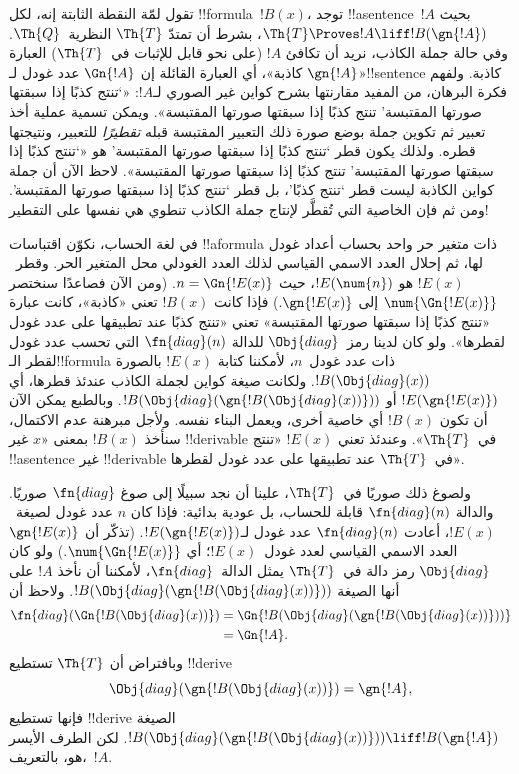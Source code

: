\documentclass[../../../include/open-logic-section]{subfiles}
\begin{document}


\begin{explain}
تقول لمّة النقطة الثابتة إنه، لكل !!{formula}~$!B(x)$، توجد
!!a{sentence}~$!A$ بحيث $\Th{T}\Proves !A\liff !B(\gn{!A})$، بشرط
أن تمتدّ $\Th{T}$ النظرية~$\Th{Q}$. وفي حالة جملة الكاذب، نريد أن
تكافئ $!A$ (على نحو قابل للإثبات في~$\Th{T}$) العبارة «$\gn{!A}$
كاذبة»، أي العبارة القائلة إن $\Gn{!A}$ عدد غودل لـ!!{sentence}
كاذبة. ولفهم فكرة البرهان، من المفيد مقارنتها بشرح كواين غير الصوري
لـ$!A$: «`تنتج كذبًا إذا سبقتها صورتها المقتبسة' تنتج كذبًا إذا
سبقتها صورتها المقتبسة». ويمكن تسمية عملية أخذ تعبير ثم تكوين جملة
بوضع صورة ذلك التعبير المقتبسة قبله \emph{تقطيرًا} للتعبير، ونتيجتها
قطره. ولذلك يكون قطر `تنتج كذبًا إذا سبقتها صورتها المقتبسة' هو
«`تنتج كذبًا إذا سبقتها صورتها المقتبسة' تنتج كذبًا إذا سبقتها صورتها
المقتبسة». لاحظ الآن أن جملة كواين الكاذبة ليست قطر `تنتج كذبًا'، بل
قطر `تنتج كذبًا إذا سبقتها صورتها المقتبسة'. ومن ثم فإن الخاصية التي
تُقطَّر لإنتاج جملة الكاذب تنطوي هي نفسها على التقطير!{}

في لغة الحساب، نكوّن اقتباسات !!a{formula} ذات متغير حر واحد بحساب
أعداد غودل لها، ثم إحلال العدد الاسمي القياسي لذلك العدد الغودلي محل
المتغير الحر. وقطر~$!E(x)$ هو $!E(\num{n})$، حيث
$n=\Gn{!E(x)}$. (ومن الآن فصاعدًا سنختصر $\num{\Gn{!E(x)}}$ إلى
$\gn{!E(x)}$.) فإذا كانت $!B(x)$ تعني «كاذبة»، كانت عبارة «تنتج
كذبًا إذا سبقتها صورتها المقتبسة» تعني «تنتج كذبًا عند تطبيقها على عدد
غودل لقطرها». ولو كان لدينا رمز~$\Obj{diag}$ للدالة $\fn{diag}(n)$
التي تحسب عدد غودل لقطر الـ!!{formula} ذات عدد غودل~$n$، لأمكننا كتابة
$!E(x)$ بالصورة $!B(\Obj{diag}(x))$. ولكانت صيغة كواين لجملة الكاذب
عندئذ قطرها، أي $!E(\gn{!E(x)})$ أو
$!B(\Obj{diag}(\gn{!B(\Obj{diag}(x))}))$. وبالطبع يمكن الآن أن تكون
$!B(x)$ أي خاصية أخرى، ويعمل البناء نفسه. ولأجل مبرهنة عدم الاكتمال،
سنأخذ $!B(x)$ بمعنى «$x$ غير !!{derivable} في~$\Th{T}$». وعندئذ
تعني $!E(x)$ «تنتج !!a{sentence} غير !!{derivable} في~$\Th{T}$ عند
تطبيقها على عدد غودل لقطرها».

ولصوغ ذلك صوريًا في~$\Th{T}$، علينا أن نجد سبيلًا إلى صوغ
$\fn{diag}$ صوريًا. والدالة $\fn{diag}(n)$ قابلة للحساب، بل عودية
بدائية: فإذا كان $n$ عدد غودل لصيغة~$!E(x)$، أعادت $\fn{diag}(n)$
عدد غودل لـ$!E(\gn{!E(x)})$. (تذكّر أن $\gn{!E(x)}$ العدد الاسمي
القياسي لعدد غودل~$!E(x)$؛ أي $\num{\Gn{!E(x)}}$.) ولو كان
$\Obj{diag}$ رمز دالة في~$\Th{T}$ يمثل الدالة~$\fn{diag}$، لأمكننا
أن نأخذ $!A$ على أنها الصيغة
$!B(\Obj{diag}(\gn{!B(\Obj{diag}(x))}))$. ولاحظ أن
\begin{align*}
\fn{diag}(\Gn{!B(\Obj{diag}(x))}) & =
\Gn{!B(\Obj{diag}(\gn{!B(\Obj{diag}(x))}))} \\
& = \Gn{!A}.
\end{align*}
وبافتراض أن $\Th{T}$ تستطيع !!{derive}
\[
\Obj{diag}(\gn{!B(\Obj{diag}(x))}) = \gn{!A},
\]
فإنها تستطيع !!{derive} الصيغة
$!B(\Obj{diag}(\gn{!B(\Obj{diag}(x))}))\liff !B(\gn{!A})$. لكن
الطرف الأيسر هو، بالتعريف،~$!A$.


\end{explain}
\end{document}
